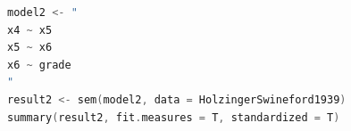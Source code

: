 \begin{lstlisting}[language=c++,label={code:13_02},caption={パス解析のモデル}]
model2 <- "
x4 ~ x5
x5 ~ x6
x6 ~ grade
"
result2 <- sem(model2, data = HolzingerSwineford1939)
summary(result2, fit.measures = T, standardized = T)
\end{lstlisting}
